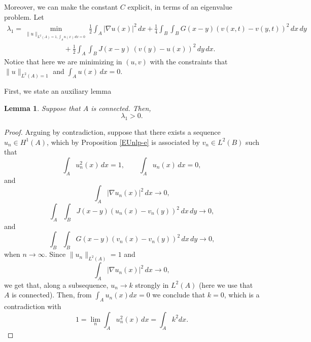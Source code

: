 \documentclass[reqno]{amsart}
\numberwithin{equation}{section}
\newtheorem{lemma}[theorem]{Lemma}
\begin{document}
Moreover, we can make the constant $C$ explicit, in terms of an eigenvalue problem.
Let
$$
\begin{array}{l}
\displaystyle
\lambda_1  = 
\min_{\| u \|_{L^2 (A)=1, \int_A u (x) \, dx =0}} 
 \frac12\int_A |\nabla u(x)|^2\,dx
  + \frac14 \int_B\!\int_B G(x-y)(v(x,t)-v(y,t))^2\,dx\,dy 
  \\[10pt]
  \qquad \qquad \qquad \qquad \displaystyle + \frac12\int_A\int_B J(x-y)\,(v(y)-u(x))^2\,dy\,dx.
  \end{array}
$$
Notice that here we are minimizing in $(u,v)$ with the constraints that 
$\| u \|_{L^2 (A)=1}$ and $\int_A u (x) \, dx =0$. 



First, we state an auxiliary lemma

\begin{lemma}\label{lemmaabneumann} Suppose that $A$ is connected. Then,
$$
\lambda_1 > 0.
$$
\end{lemma}


\begin{proof} Arguing by contradiction, suppose that there exists a sequence $u_n\in H^1(A)$, which by Proposition \ref{EUnlp-e} is associated by $v_n\in L^2(B)$ such that
$$\int_A u_n^2(x)\, dx=1, \qquad \int_A u_n (x) \, dx =0,$$
and
$$\int_A |\nabla u_n(x)|^2\, dx \to 0, $$ 
$$\int_A\int_B J(x-y)(u_n(x)-v_n(y))^2\, dx \, dy \to 0,$$
and 
$$\int_B\int_BG(x-y)(v_n(x)-v_n(y))^2\, dx\, dy\to 0,$$
when $n\to \infty$.
Since $\|u_n\|_{L^2(A)}=1$ and 
$$\int_A |\nabla u_n(x)|^2\, dx\to 0,$$
we get that, along a subsequence, $u_n\to k$ strongly in $L^2(A)$ (here we use that $A$ is connected). 
Then, from $\int_A u_n (x) dx=0$ we conclude that $k=0$, which is a contradiction with $$1= \lim_n \int_A u_n^2(x)\, dx =\int_A k^2dx.$$
\end{proof}
\end{document}

